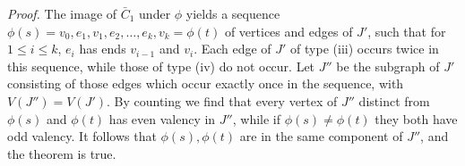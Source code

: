 \textit{Proof.} The image of $\bar{C}_1$ under $\phi$ yields a sequence $\phi(s) = v_0, e_1, v_1, e_2, \dots, e_k, v_k = \phi(t)$ of vertices and edges of $J'$, such that for $1 \le i \le k$, $e_i$ has ends $v_{i-1}$ and $v_i$. Each edge of $J'$ of type (iii) occurs twice in this sequence, while those of type (iv) do not occur. Let $J''$ be the subgraph of $J'$ consisting of those edges which occur exactly once in the sequence, with $V(J'') = V(J')$. By counting we find that every vertex of $J''$ distinct from $\phi(s)$ and $\phi(t)$ has even valency in $J''$, while if $\phi(s) \ne \phi(t)$ they both have odd valency. It follows that $\phi(s), \phi(t)$ are in the same component of $J''$, and the theorem is true.

